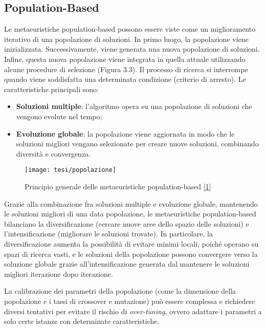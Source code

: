 \subsection{Population-Based} \hypertarget{pb}{}

Le metaeuristiche population-based possono essere viste come un miglioramento iterativo di una popolazione di soluzioni. In primo luogo, la popolazione viene inizializzata. Successivamente, viene generata una nuova popolazione di soluzioni. Infine, questa nuova popolazione viene integrata in quella attuale utilizzando alcune procedure di selezione (Figura 3.3). Il processo di ricerca si interrompe quando viene soddisfatta una determinata condizione (criterio di arresto). %
Le caratteristiche principali sono:
\begin{itemize}
    \item \textbf{Soluzioni multiple}: l'algoritmo opera su una popolazione di soluzioni che vengono evolute nel tempo;
    \item \textbf{Evoluzione globale}: la popolazione viene aggiornata in modo che le soluzioni migliori vengano selezionate per creare nuove soluzioni, combinando diversità e convergenza.
\end{itemize}
\hypertarget{img3}{}
\begin{figure}[!ht] 
    \centering 
    \texttt{[image: tesi/popolazione]} 
    \caption[Principio generale delle metaeuristiche population-based]{Principio generale delle metaeuristiche population-based [\hyperlink{bibliografia}{1}]}
\end{figure}

Grazie alla combinazione fra soluzioni multiple e evoluzione globale, mantenendo le soluzioni migliori di una data popolazione, le metaeuristiche population-based bilanciano la diversificazione (cercare nuove aree dello spazio delle soluzioni) e l'intensificazione (migliorare le soluzioni trovate). In particolare, la diversificazione aumenta la possibilità di evitare minimi locali, poiché operano su spazi di ricerca vasti, e le soluzioni della popolazione possono convergere verso la soluzione globale grazie all'intensificazione generata dal mantenere le soluzioni migliori iterazione dopo iterazione.

La calibrazione dei parametri della popolazione (come la dimensione della popolazione e i tassi di crossover e mutazione) può essere complessa e richiedere diversi tentativi per evitare il rischio di \emph{over-tuning}\glsfirstoccur, ovvero adattare i parametri a solo certe istanze con determinate caratteristiche.

